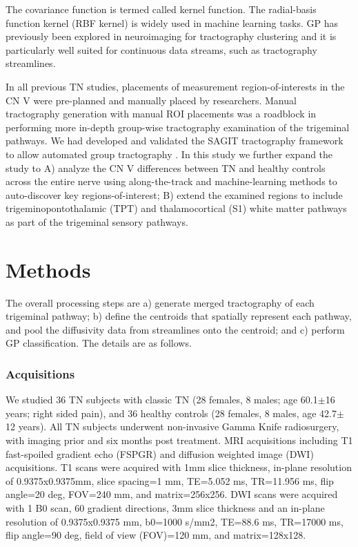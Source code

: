 The covariance function is termed called kernel function. The radial-basis function kernel (RBF kernel) is widely used in machine learning tasks. GP has previously been explored in neuroimaging for tractography clustering \cite{Wassermann2010} and it is particularly well suited for continuous data streams, such as tractography streamlines.

In all previous TN studies, placements of measurement region-of-interests in the CN V were pre-planned and manually placed by researchers. Manual tractography generation with manual ROI placements was a roadblock in performing more in-depth group-wise tractography examination of the trigeminal pathways. We had developed and validated the SAGIT tractography framework to allow automated group tractography \cite{Chen2016}. In this study we further expand the study to A) analyze the CN V differences between TN and healthy controls across the entire nerve using along-the-track and machine-learning methods to auto-discover key regions-of-interest; B) extend the examined regions to include trigeminopontothalamic (TPT) and thalamocortical (S1) white matter pathways as part of the trigeminal sensory pathways.

\section{Methods}

The overall processing steps are a) generate merged tractography of each trigeminal pathway; b) define the centroids that spatially represent each pathway, and pool the diffusivity data from streamlines onto the centroid; and c) perform GP classification. The details are as follows. 

\subsubsection{Acquisitions}
We studied 36 TN subjects with classic TN (28 females, 8 males; age 60.1$\pm$16 years; right sided pain), and 36 healthy controls (28 females, 8 males, age 42.7$\pm$12 years).  All TN subjects underwent non-invasive Gamma Knife radiosurgery, with imaging prior and six months post treatment. MRI acquisitions including T1 fast-spoiled gradient echo (FSPGR) and diffusion weighted image (DWI) acquisitions. T1 scans were acquired with 1mm slice thickness, in-plane resolution of 0.9375x0.9375mm, slice spacing=1 mm, TE=5.052 ms, TR=11.956 ms, flip angle=20 deg, FOV=240 mm, and matrix=256x256. DWI scans were acquired with 1 B0 scan, 60 gradient directions, 3mm slice thickness and an in-plane resolution of 0.9375x0.9375 mm, b0=1000 s/mm2, TE=88.6 ms, TR=17000 ms, flip angle=90 deg, field of view (FOV)=120 mm, and matrix=128x128.

